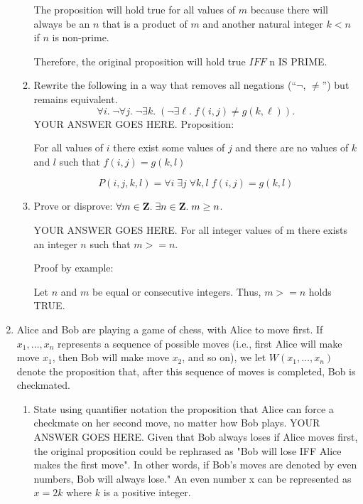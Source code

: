 \documentclass{article}
\begin{document}
\begin{enumerate}
\begin{enumerate}
The proposition will hold true for all values of $m$ because there will always be an $n$ that is a product of $m$ and another natural integer $k<n$ if $n$ is non-prime. 

Therefore, the original proposition will hold true $IFF$ n IS PRIME.


\item Rewrite the following in a way that
removes all negations (``$\neg$, $\ne$'') but remains equivalent.
\[ \forall i . \; \neg \forall j . \;
\neg \exists k . \; 
(\neg \exists \ell . \; f(i,j) \ne g(k,\ell)). \]
\newline
YOUR ANSWER GOES HERE.
\newline
Proposition:

For all values of $i$  there exist some values of $j$ and there are no values of $k$ and $l$ such that $f(i,j)=g(k,l)$ 

\[ P(i,j,k,l) = \forall i  \; \exists j  \;
\forall k, l \; f(i,j)=g(k,l) \] 	


\item Prove or disprove:
$\forall m \in \mbox{{\bfseries Z}} . \; \exists n \in \mbox{{\bfseries Z}} . \; m \ge n$.

YOUR ANSWER GOES HERE.
\newline
For all integer values of m there exists an integer $n$ such that $m>=n$.

Proof by example:

Let $n$ and $m$ be equal or consecutive integers. Thus, $m>=n$ holds TRUE.
\end{enumerate}
\newpage

\item
Alice and Bob are playing a game of chess,
with Alice to move first.
If $x_1,\dots,x_n$ represents a sequence of possible moves
(i.e., first Alice will make move $x_1$, then Bob will make move $x_2$,
and so on),
we let $W(x_1,\dots,x_n)$ denote the proposition that,
after this sequence of moves is completed,
Bob is checkmated.

\begin{enumerate}
\item State using quantifier notation the proposition that Alice
can force a checkmate on her second move, no matter how Bob plays.
\newline \newline
YOUR ANSWER GOES HERE.
\newline \newline
Given that Bob always loses if Alice moves first, the original proposition could be rephrased as "Bob will lose IFF Alice makes the first move". In other words, if Bob's moves are denoted by even numbers, Bob will always lose."
An even number x can be represented as $x=2k$ where $k$ is a positive integer.


\end{enumerate}
\end{enumerate}
\end{document}
